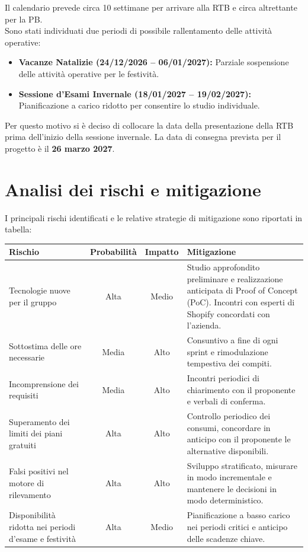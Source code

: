 \vspace{2mm}
Il calendario prevede circa 10 settimane per arrivare alla RTB e circa altrettante per la PB. \\
Sono stati individuati due periodi di possibile rallentamento delle attività operative:
\begin{itemize}
    \item \textbf{Vacanze Natalizie (24/12/2026 -- 06/01/2027):} Parziale sospensione delle attività operative per le festività.
    \item \textbf{Sessione d'Esami Invernale (18/01/2027 -- 19/02/2027):} Pianificazione a carico ridotto per consentire lo studio individuale.
\end{itemize}
Per questo motivo si è deciso di collocare la data della presentazione della RTB prima dell'inizio della sessione invernale.
La data di consegna prevista per il progetto è il \textbf{26 marzo 2027}.

\newpage
\section {Analisi dei rischi e mitigazione}
I principali rischi identificati e le relative strategie di mitigazione sono riportati in tabella:

\vspace{2mm}
\noindent
\begin{tabularx}{\textwidth}{|X c c X|}
\hline
\textbf{Rischio} & \textbf{Probabilità} & \textbf{Impatto} & \textbf{Mitigazione} \\
\hline
Tecnologie nuove per il gruppo & Alta & Medio & Studio approfondito preliminare e realizzazione anticipata di Proof of Concept (PoC). Incontri con esperti di Shopify concordati con l'azienda. \\
\hline
Sottostima delle ore necessarie & Media & Alto & Consuntivo a fine di ogni sprint e rimodulazione tempestiva dei compiti. \\
\hline
Incomprensione dei requisiti & Media & Alto & Incontri periodici di chiarimento con il proponente e verbali di conferma. \\
\hline
Superamento dei limiti dei piani gratuiti & Alta & Alto & Controllo periodico dei consumi, concordare in anticipo con il proponente le alternative disponibili. \\
\hline
Falsi positivi nel motore di rilevamento & Alta & Alto & Sviluppo stratificato, misurare in modo incrementale e mantenere le decisioni in modo deterministico. \\
\hline
Disponibilità ridotta nei periodi d'esame e festività & Alta & Medio & Pianificazione a basso carico nei periodi critici e anticipo delle scadenze chiave. \\
\hline
\end{tabularx}

